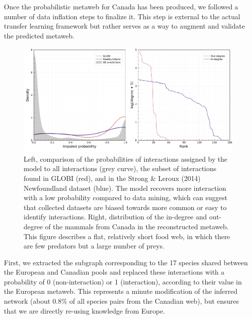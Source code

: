 \documentclass[11pt]{article}
\makeatletter
\def\maxwidth{\ifdim\Gin@nat@width>\linewidth\linewidth
\else\Gin@nat@width\fi}
\let\Oldincludegraphics\includegraphics
\renewcommand{\includegraphics}[1]{\Oldincludegraphics[width=\maxwidth]{#1}}
\makeatother
\begin{document}
Once the probabilistic metaweb for Canada has been produced, we followed
a number of data inflation steps to finalize it. This step is external
to the actual transfer learning framework but rather serves as a way to
augment and validate the predicted metaweb.

\begin{figure}
\hypertarget{fig:inflation}{%
\centering
\includegraphics{figures/figure-validation.png}
\caption{Left, comparison of the probabilities of interactions assigned
by the model to all interactions (grey curve), the subset of
interactions found in GLOBI (red), and in the Strong \& Leroux (2014)
Newfoundland dataset (blue). The model recovers more interaction with a
low probability compared to data mining, which can suggest that
collected datasets are biased towards more common or easy to identify
interactions. Right, distribution of the in-degree and out-degree of the
mammals from Canada in the reconstructed metaweb. This figure describes
a flat, relatively short food web, in which there are few predators but
a large number of preys.}\label{fig:inflation}
}
\end{figure}

First, we extracted the subgraph corresponding to the 17 species shared
between the European and Canadian pools and replaced these interactions
with a probability of 0 (non-interaction) or 1 (interaction), according
to their value in the European metaweb. This represents a minute
modification of the inferred network (about 0.8\% of all species pairs
from the Canadian web), but ensures that we are directly re-using
knowledge from Europe.
\end{document}
